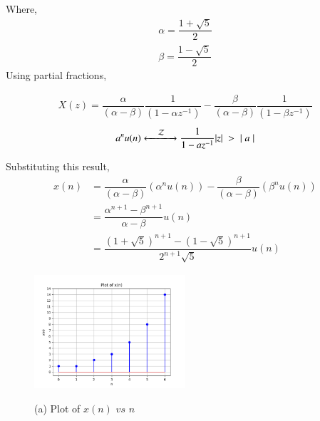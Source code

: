 \documentclass[journal,12pt,twocolumn]{IEEEtran}
\theoremstyle{remark}
\begin{document}
	
	Where, \begin{align}\alpha = \dfrac{1 +\sqrt{5}}{2} \\ \beta = \dfrac{1 -\sqrt{5}}{2}\end{align}
	Using partial fractions,
	
	\begin{align}
		X(z) = \dfrac{\alpha}{(\alpha - \beta)} \dfrac{1}{(1 - \alpha z^{-1})} - \dfrac{\beta}{(\alpha - \beta)} \dfrac{1}{(1 - \beta z^{-1})}
	\end{align}
	\begin{align}a^n u(n)
	\xleftarrow[]{\hspace{0.4cm}{\mathcal{Z}}\hspace{0.1cm}}\xrightarrow[]{}
	\dfrac{1}{1 - a z^{-1}}  |z| \hspace{0.1cm}> \hspace{0.1cm} \lvert \hspace{0.1cm} a \hspace{0.1cm} \rvert
	\end{align}

	
	Substituting this result,
	\begin{align}
		x(n) &= \dfrac{\alpha}{(\alpha - \beta)} ({\alpha}^n u(n)) - \dfrac{\beta}{(\alpha - \beta)} ({\beta}^n u(n)) \\
	&= \dfrac{\alpha^{n+1} - \beta^{n+1} }{\alpha - \beta} u(n)\\
	 &= \dfrac{(1 + \sqrt{5})^{n+1} - (1 - \sqrt{5})^{n+1} }{2^{n+1} \sqrt{5}}u(n)
	\end{align}
	
	\newpage
	
	\begin{figure}[htbp]
		\centering
		\includegraphics[width=0.5\textwidth]{figs/fig1.png}
		\label{fibonacci}
		\caption*{\hspace{2cm} (a) Plot of $x(n)$ $vs$ $n$}
	\end{figure}
	
\end{document}
